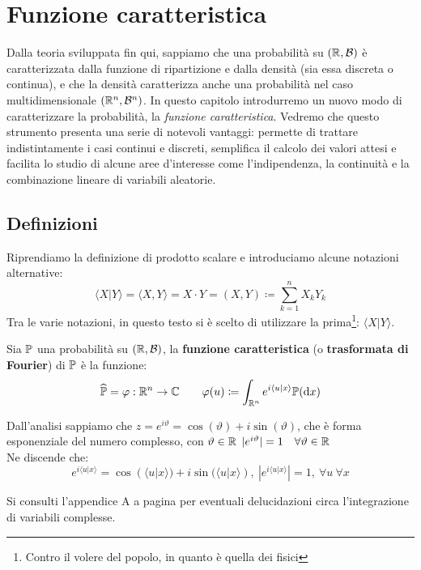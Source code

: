 \section{Funzione caratteristica}
Dalla teoria sviluppata fin qui, sappiamo che una probabilità su $(\mathbb R,\mathcal B)$ è caratterizzata dalla funzione di ripartizione e dalla densità (sia essa discreta o continua), e che la densità caratterizza anche una probabilità nel caso multidimensionale $(\mathbb R^n, \mathcal B^n)$.
In questo capitolo introdurremo un nuovo modo di caratterizzare la probabilità, la \emph{funzione caratteristica}.
Vedremo che questo strumento presenta una serie di notevoli vantaggi: permette di trattare indistintamente i casi continui e discreti, semplifica il calcolo dei valori attesi e facilita lo studio di alcune aree d'interesse come l'indipendenza, la continuità e la combinazione lineare di variabili aleatorie.

\subsection{Definizioni}
Riprendiamo la definizione di prodotto scalare e introduciamo alcune notazioni alternative:
$$\langle X|Y \rangle = \langle X,Y\rangle = X \cdot Y= (X,Y) \coloneqq \sum^n_{k=1}X_kY_k$$
Tra le varie notazioni, in questo testo si è scelto di utilizzare la prima\footnote{Contro il volere del popolo, in quanto è quella dei fisici}: $\langle X|Y \rangle$.

\begin{defn}
  Sia $\mathbb P$ una probabilità su $(\mathbb R,\mathcal B)$, la \textbf{funzione caratteristica} (o \textbf{trasformata di Fourier}) di $\mathbb P$ è la funzione:
    $$\widehat{\mathbb P}=\varphi: \mathbb R^n \to \mathbb C \qquad \varphi (u) \coloneqq \int_{\mathbb R^n}e^{i\langle u|x\rangle}\mathbb P(\mathrm d x)$$
\end{defn}

Dall'analisi sappiamo che $z=e^{i \vartheta}=\cos(\vartheta) + i \sin (\vartheta)$, che è forma esponenziale del numero complesso, con $\vartheta \in \mathbb R$ $|e^{i \vartheta}|=1 \quad \forall \vartheta \in \mathbb R$\\
\medskip
Ne discende che:
$$e^{i\langle u|x\rangle}=\cos(\langle u|x\rangle) + i \sin (\langle u|x\rangle), \ |e^{i \langle u|x\rangle}|=1, \ \forall u \ \forall x$$

Si consulti l'appendice A a pagina \pageref{int-complessa} per eventuali delucidazioni circa l'integrazione di variabili complesse.


